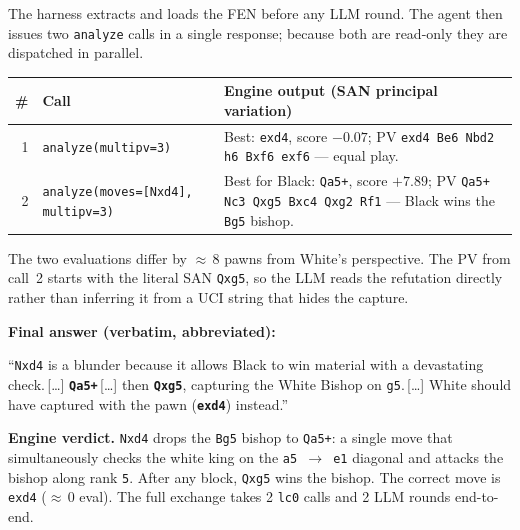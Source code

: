 \begin{tcolorbox}[notebox, title={Tool-call trace}]

\noindent The harness extracts and loads the FEN before any LLM round.
The agent then issues two \texttt{analyze} calls in a single response;
because both are read-only they are dispatched in parallel.

\smallskip
\begin{tabular}{@{}rlp{8.6cm}@{}}
  \toprule
  \textbf{\#} & \textbf{Call} & \textbf{Engine output (SAN principal variation)} \\
  \midrule
  1 & \texttt{analyze(multipv=3)} &
    Best: \texttt{exd4}, score $-0.07$;
    PV \texttt{exd4 Be6 Nbd2 h6 Bxf6 exf6} — equal play. \\
  2 & \texttt{analyze(moves=[Nxd4], multipv=3)} &
    Best for Black: \texttt{Qa5+}, score $+7.89$;
    PV \texttt{Qa5+ Nc3 Qxg5 Bxc4 Qxg2 Rf1} — Black wins the \texttt{Bg5}
    bishop. \\
  \bottomrule
\end{tabular}

\medskip
\noindent The two evaluations differ by ${\approx}\,8$ pawns from White's
perspective.  The PV from call~2 starts with the literal SAN
\texttt{Qxg5}, so the LLM reads the refutation directly rather than
inferring it from a UCI string that hides the capture.

\medskip
\noindent\textbf{Final answer (verbatim, abbreviated):}

\smallskip
\begin{tcolorbox}[colback=black!4, colframe=black!25, sharp corners, boxrule=0.4pt,
  left=8pt, right=8pt, top=6pt, bottom=6pt, fontupper=\small]
``\texttt{Nxd4} is a blunder because it allows Black to win material with a
devastating check.\,[\ldots] \textbf{\texttt{Qa5+}}\,[\ldots] then
\textbf{\texttt{Qxg5}}, capturing the White Bishop on \texttt{g5}.\,[\ldots]
White should have captured with the pawn (\textbf{\texttt{exd4}}) instead.''
\end{tcolorbox}

\medskip
\noindent\textbf{Engine verdict.}  \texttt{Nxd4} drops the \texttt{Bg5}
bishop to \texttt{Qa5+}: a single move that simultaneously checks the
white king on the \texttt{a5\,$\to$\,e1} diagonal and attacks the bishop
along rank \texttt{5}.  After any block, \texttt{Qxg5} wins the bishop.
The correct move is \texttt{exd4} (${\approx}\,0$ eval).  The full
exchange takes 2 \texttt{lc0} calls and 2 LLM rounds end-to-end.
\end{tcolorbox}


